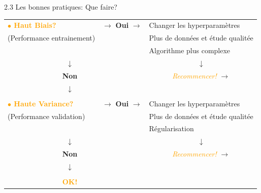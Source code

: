 \begin{frame}{2.3 Les bonnes pratiques: Que faire?}
  \begin{table}
    \footnotesize
    \begin{tabular}{ccccl}
      \multicolumn{3}{l}{\textcolor{orange}{\textbf{$\bullet$ Haut Biais?}}} & \boldmath $\rightarrow$ \textbf{Oui} $\rightarrow$ \unboldmath & Changer les hyperparamètres \\
      \multicolumn{3}{l}{(Performance entrainement)} & & Plus de données et étude qualitée \\
      & & & & Algorithme plus complexe \\
      & & \boldmath $\downarrow$ \unboldmath & & \multicolumn{1}{c}{\boldmath $\downarrow$ \boldmath} \\
      & & \textbf{Non} & & \multicolumn{1}{c}{\textit{\textcolor{orange}{Recommencer!}} \boldmath $\rightarrow$ \unboldmath}\\
      & & \boldmath $\downarrow$ \unboldmath & & \\
      & & & & \\
      \multicolumn{3}{l}{\textcolor{orange}{\textbf{$\bullet$ Haute Variance?}}} & \boldmath $\rightarrow$ \textbf{Oui} $\rightarrow$ \unboldmath & Changer les hyperparamètres \\
      \multicolumn{3}{l}{(Performance validation)} & & Plus de données et étude qualitée  \\
      & & & & Régularisation \\
      & & \boldmath $\downarrow$ \unboldmath & & \multicolumn{1}{c}{\boldmath $\downarrow$ \boldmath} \\
      & & \textbf{Non} & & \multicolumn{1}{c}{\textit{\textcolor{orange}{Recommencer!}} \boldmath $\rightarrow$ \unboldmath}\\
      & & \boldmath $\downarrow$ \unboldmath & & \\
      & & & & \\
      & & \textcolor{orange}{\textbf{OK!}} & & \\      
    \end{tabular}
  \end{table}
\end{frame}

